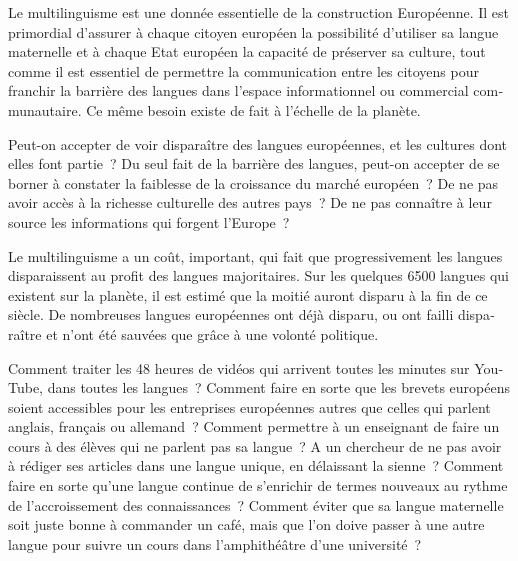 \begin{french}


\begin{multicols}{2}

Le multilinguisme est une donnée essentielle de la construction Européenne. Il est primordial d’assurer à chaque citoyen européen la possibilité d’utiliser sa langue maternelle et à chaque Etat européen la capacité de préserver sa culture, tout comme il est essentiel de permettre la communication entre les citoyens pour franchir la barrière des langues dans l’espace informationnel ou commercial communautaire. Ce même besoin existe de fait à l’échelle de la planète.

Peut-on accepter de voir disparaître des langues européennes, et les cultures dont elles font partie~? Du seul fait de la barrière des langues, peut-on accepter de se borner à constater la faiblesse de la croissance du marché européen~? De ne pas avoir accès à la richesse culturelle des autres pays~? De ne pas connaître à leur source les informations qui forgent l’Europe~?

Le multilinguisme a un coût, important, qui fait que progressivement les langues disparaissent au profit des langues majoritaires. Sur les quelques 6500 langues qui existent sur la planète, il est estimé que la moitié auront disparu à la fin de ce siècle. De nombreuses langues européennes ont déjà disparu, ou ont failli disparaître et n’ont été sauvées que grâce à une volonté politique.

Comment traiter les 48 heures de vidéos qui arrivent toutes les minutes sur YouTube, dans toutes les langues~? Comment faire en sorte que les brevets européens soient accessibles pour les entreprises européennes autres que celles qui parlent anglais, français ou allemand~? Comment permettre à un enseignant de faire un cours à des élèves qui ne parlent pas sa langue~? A un chercheur de ne pas avoir à rédiger ses articles dans une langue unique, en délaissant la sienne~? Comment faire en sorte qu’une langue continue de s’enrichir de termes nouveaux au rythme de l’accroissement des connaissances~? Comment éviter que sa langue maternelle soit juste bonne à commander un café, mais que l’on doive passer à une autre langue pour suivre un cours dans l’amphithéâtre d’une université~?


\end{multicols}
\end{french}
